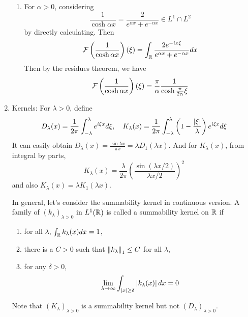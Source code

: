 \begin{enumerate}[label=\arabic*.]
\begin{enumerate}[label=(\arabic*)]
		\item For $\alpha > 0$, considering
		\begin{equation*}
			\frac{1}{\cosh \alpha x} = \frac{2}{e^{\alpha x} + e^{-\alpha x}} \in L^1\cap L^2
		\end{equation*}
		by directly calculating. Then
		\begin{equation*}
			\mathcal{F}\left(\frac{1}{\cosh \alpha x}\right)(\xi) = \int_{\mathbb{R}} \frac{2e^{-ix\xi}}{e^{\alpha x} + e^{-\alpha x}}dx
		\end{equation*}
		Then by the residues theorem, we have
		\begin{equation*}
			\mathcal{F}\left(\frac{1}{\cosh \alpha x}\right)(\xi) = \frac{\pi}{\alpha}\frac{1}{\cosh\frac{\pi}{2\alpha}\xi}
		\end{equation*}
	\end{enumerate}


	\item Kernels: For $\lambda > 0$, define
	\begin{equation*}
		D_\lambda(x) = \frac{1}{2\pi}\int_{-\lambda}^\lambda e^{i\xi x}d\xi,\quad K_\lambda(x) = \frac{1}{2\pi}\int_{-\lambda}^\lambda \left(1-\frac{\left\lvert\xi\right\lvert}{\lambda}\right)e^{i\xi x}d\xi
	\end{equation*}
	It can easily obtain $D_\lambda(x)=\frac{\sin \lambda x}{\pi x} = \lambda D_1(\lambda x)$. And for $K_\lambda(x)$, from integral by parts,
	\begin{equation*}
		K_\lambda(x) = \frac{\lambda}{2 \pi}\left(\frac{\sin (\lambda x / 2)}{\lambda x / 2}\right)^2
	\end{equation*}
	and also $K_\lambda(x) = \lambda K_1(\lambda x)$.

	\noindent In general, let's consider the summability kernel in continuous version. A family of $(k_\lambda)_{\lambda > 0}$ in $L^1(\mathbb{R})$ is called a summability kernel on $\mathbb{R}$ if
	\begin{enumerate}[label=(\arabic{*})]
		\item for all $\lambda$, $\int_{\mathbb{R}} k_\lambda(x)dx = 1$,
		\item there is a $C> 0$ such that $\left\lVert k_\lambda\right\lVert_1 \leq C$ for all $\lambda$,
		\item for any $\delta > 0$, 
		\begin{equation*}
			\lim_{\lambda \rightarrow \infty} \int_{\left\lvert x\right\lvert \geq \delta} \left\lvert k_\lambda(x)\right\lvert dx = 0
		\end{equation*}
	\end{enumerate}
	Note that $(K_\lambda)_{\lambda > 0}$ is a summability kernel but not $(D_\lambda)_{\lambda > 0}$.


\end{enumerate}
